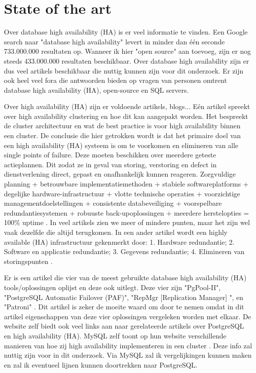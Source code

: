 
\section{State of the art}
\label{sec:state of the art}
Over database high availability (HA) is er veel informatie te vinden. Een Google search naar "database high availability" levert in minder dan één seconde 733.000.000 resultaten op. Wanneer ik hier "open source" aan toevoeg, zijn er nog steeds 433.000.000 resultaten beschikbaar. Over database high availability zijn er dus veel artikels beschikbaar die nuttig kunnen zijn voor dit onderzoek. Er zijn ook heel veel fora die antwoorden bieden op vragen van personen omtrent database high availability (HA), open-source en SQL servers.


Over high availability (HA) zijn er voldoende artikels, blogs... Eén artikel spreekt over high availability clustering en hoe dit kan aangepakt worden. Het bespreekt de cluster architectuur en wat de best practice is voor high availability binnen een cluster. De conclusie die hier getrokken wordt is dat het primaire doel van een high availability (HA) systeem is om te voorkomen en elimineren van alle single points of failure. Deze moeten beschikken over meerdere geteste actieplannen. Dit zodat ze in geval van storing, verstoring en defect in dienstverlening direct, gepast en onafhankelijk kunnen reageren. 
Zorgvuldige planning + betrouwbare implementatiemethoden + stabiele softwareplatforms + degelijke hardware-infrastructuur + vlotte technische operaties + voorzichtige managementdoelstellingen + consistente databeveiliging + voorspelbare redundantiesystemen + robuuste back-upoplossingen + meerdere herstelopties = 100\% uptime \autocite{Singer2020}.
In veel artikels zien we meer of mindere punten, maar het zijn wel vaak dezelfde die altijd terugkomen. In een ander artikel wordt een highly available (HA) infrastructuur gekenmerkt door: 1. Hardware redundantie; 2. Software en applicatie redundantie; 3. Gegevens redundantie; 4. Elimineren van storingspunten \autocite{Jevtic2018}.


Er is een artikel die vier van de meest gebruikte database high availability (HA) tools/oplossingen oplijst en deze ook uitlegt. Deze vier zijn "PgPool-II", "PostgreSQL Automatic Failover (PAF)", "RepMgr [Replication Manager] ", en "Patroni" \autocite{Akhtar2020}. Dit artikel is zeker de moeite waard om door te nemen omdat in dit artikel eigenschappen van deze vier oplossingen vergeleken worden met elkaar. De website zelf biedt ook veel links aan naar gerelateerde artikels over PostgreSQL en high availability (HA). 
MySQL zelf toont op hun website verschillende manieren van hoe zij high availability implementeren in een cluster \autocite{MySQL2021}. Deze info zal nuttig zijn voor in dit onderzoek. Via MySQL zal ik vergelijkingen kunnen maken en zal ik eventueel lijnen kunnen doortrekken naar PostgreSQL.



